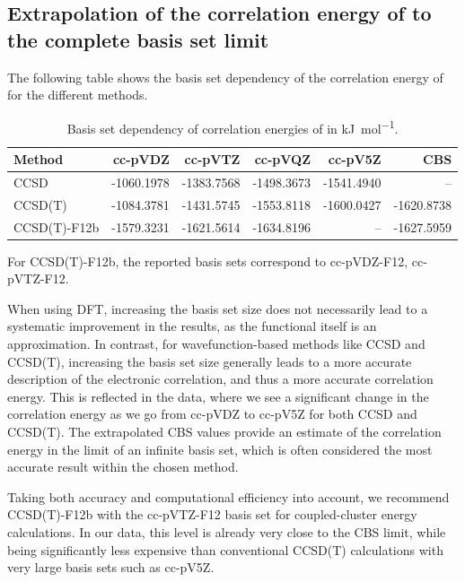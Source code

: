 \documentclass[a4paper,12pt]{scrartcl}
\begin{document}
\subsection{Extrapolation of the correlation energy of  to the complete basis set limit}

The following table shows the basis set dependency of the correlation energy of  for the different methods.

\begin{table}[H]
\centering
\caption{Basis set dependency of correlation energies of  in \si{\kilo\joule\per\mole}.}
\label{tab:f2_correlation_energies}
\begin{tabular}{lrrrrr}
\toprule
Method & cc-pVDZ & cc-pVTZ & cc-pVQZ & cc-pV5Z & CBS \\
\midrule
CCSD         & -1060.1978 & -1383.7568 & -1498.3673 & -1541.4940 & -- \\
CCSD(T)      & -1084.3781 & -1431.5745 & -1553.8118 & -1600.0427 & -1620.8738 \\
CCSD(T)-F12b & -1579.3231 & -1621.5614 & -1634.8196 & --        & -1627.5959 \\
\bottomrule
\end{tabular}
\end{table}

For CCSD(T)-F12b, the reported basis sets correspond to cc-pVDZ-F12, cc-pVTZ-F12.

When using DFT, increasing the basis set size does not necessarily lead to a systematic improvement in the results, as the functional itself is an approximation. In contrast, for wavefunction-based methods like CCSD and CCSD(T), increasing the basis set size generally leads to a more accurate description of the electronic correlation, and thus a more accurate correlation energy. This is reflected in the data, where we see a significant change in the correlation energy as we go from cc-pVDZ to cc-pV5Z for both CCSD and CCSD(T). The extrapolated CBS values provide an estimate of the correlation energy in the limit of an infinite basis set, which is often considered the most accurate result within the chosen method.

Taking both accuracy and computational efficiency into account, we recommend CCSD(T)-F12b with the cc-pVTZ-F12 basis set for coupled-cluster energy calculations. In our data, this level is already very close to the CBS limit, while being significantly less expensive than conventional CCSD(T) calculations with very large basis sets such as cc-pV5Z.
\end{document}
